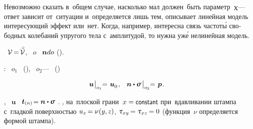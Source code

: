 \begin{otherlanguage}{russian}
Невозможно сказать в~общем случае, насколько мал должен~быть параметр~$\upchi$\:--- ответ зависит от~ситуации и~определяется лишь тем, описывает линейная модель интересующий эффект или~нет.
Когда, например, интересна связь частот\'{ы} свободных колебаний упругого тела с~амплитудой, то нужна уж\'{е} нелинейная модель.

  ~\hbox{$\mathcal{V} \hspace{-0.2ex} = \hspace{-0.2ex} \mathcircabove{\mathcal{V}}$\hspace{-0.12em}}, ~$o$ ~${\bm{n} do}$ ().

   :  \hbox{}~${o_1}$  ~(),    \hbox{}~${o_2}$\:--- ~()

\nopagebreak\vspace{-0.2em}\begin{equation}\label{lineartheory:boundaryconditions}
\bm{u} \hspace{.1ex} \bigr|_{o_1} \hspace{-0.64ex} = \hspace{.2ex} \bm{u}_{\raisemath{-0.1em}{0}}
\hspace{.2ex} ,
\hspace{.8em}
\unitnormalvector \dotp \linearstress \hspace{.2ex} \bigr|_{o_2} \hspace{-0.64ex} = \hspace{.2ex} \bm{p}
\hspace{.2ex} .
\end{equation}

,    ~$\bm{u}$\ru{,} ~${\tractionvector{n} \hspace{-0.2ex} = \unitnormalvector \dotp \linearstress}$ .
, на~плоской грани~${x = \constant}$ при~вдавливании штампа с~гладкой поверхностью ${u_x \hspace{-0.25ex} = \nu \hspace{.1ex} (y , \hspace{-0.1ex} z)}$, ${\mathtau_{xy} \hspace{-0.2ex} = \mathtau_{xz} \hspace{-0.2ex} = 0}$ (функция~$\nu$ определяется формой штампа).


\end{otherlanguage}

